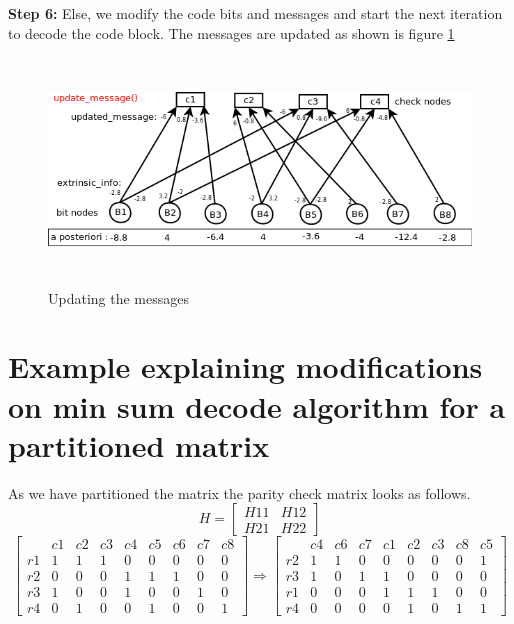 \textbf{Step 6:}
Else, we modify the code bits and messages and start the next iteration to decode the code block. The messages are updated as shown is figure \ref{minSum7}
\begin{figure}[h!]
\centering
\includegraphics[height=6cm,width=12cm]{minSum7}
\caption[Updating the messages]{Updating the messages}
\label{minSum7}
\end{figure}

\section{Example explaining modifications on min sum decode algorithm for a partitioned matrix }

As we have partitioned the matrix the parity check matrix looks as follows.
\[
H = \left[ \begin{array}{c|c}  
H11  & H12     \\ \hline
H21  & H22     \end{array} \right] 
\] 
\[
\left[ \begin{array} {c|cccccccc} 
  &    c1 &   c2 &   c3 &  c4  &  c5  &  c6  &  c7  &  c8 \\ \hline
r1 &    1  &   1  &   1  &   0  &   0  &   0  &   0  &   0 \\
r2 &    0  &   0  &   0  &   1  &   1  &   1  &   0  &   0 \\ 
r3 &    1  &   0  &   0  &   1  &   0  &   0  &   1  &   0 \\
r4 &    0  &   1  &   0  &   0  &   1  &   0  &   0  &   1 \end{array} \right] 
     \Rightarrow
\left[ \begin{array} {c|cccc|cccc} 
  &    c4 &   c6 &   c7 &  c1  &  c2  &  c3  &  c8  &  c5 \\ \hline  
r2 &     1  &   1  &   0  &   0  &   0  &   0  &   0  &   1 \\
r3 &     1  &   0  &   1  &   1  &   0  &   0  &   0  &   0 \\ \hline
r1 &     0  &   0  &   0  &   1  &   1  &   1  &   0  &   0 \\
r4 &     0  &   0  &   0  &   0  &   1  &   0  &   1  &   1 \end{array} \right] 
\]

